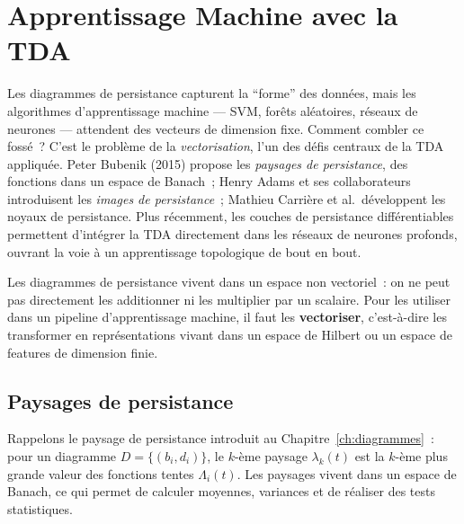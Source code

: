 \chapter{Apprentissage Machine avec la TDA}
\label{ch:ml_tda}

Les diagrammes de persistance capturent la ``forme'' des donn\'ees, mais les algorithmes d'apprentissage machine --- SVM, for\^ets al\'eatoires, r\'eseaux de neurones --- attendent des vecteurs de dimension fixe. Comment combler ce foss\'e~? C'est le probl\`eme de la \emph{vectorisation}, l'un des d\'efis centraux de la TDA appliqu\'ee. Peter Bubenik (2015) propose les \emph{paysages de persistance}, des fonctions dans un espace de Banach~; Henry Adams et ses collaborateurs introduisent les \emph{images de persistance}~; Mathieu Carri\`ere et al.\ d\'eveloppent les noyaux de persistance. Plus r\'ecemment, les couches de persistance diff\'erentiables permettent d'int\'egrer la TDA directement dans les r\'eseaux de neurones profonds, ouvrant la voie \`a un apprentissage topologique de bout en bout.

\begin{intuition}
Les diagrammes de persistance vivent dans un espace non vectoriel~:
on ne peut pas directement les additionner ni les multiplier par un
scalaire. Pour les utiliser dans un pipeline d'apprentissage machine,
il faut les \textbf{vectoriser}, c'est-\`a-dire
les transformer en repr\'esentations vivant dans un espace de Hilbert
ou un espace de features de dimension finie.
\end{intuition}

\section{Paysages de persistance}
\label{sec:landscapes}

Rappelons le paysage de persistance introduit au
Chapitre~\ref{ch:diagrammes}~: pour un diagramme
$D = \{(b_i, d_i)\}$, le $k$-\`eme paysage $\lambda_k(t)$ est la
$k$-\`eme plus grande valeur des fonctions tentes $\Lambda_i(t)$.
Les paysages vivent dans un espace de Banach, ce qui permet de calculer
moyennes, variances et de r\'ealiser des tests statistiques.

